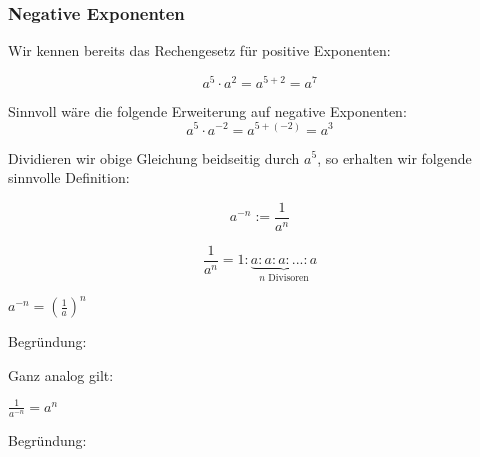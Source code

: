 \subsubsection{Negative Exponenten}
Wir kennen bereits das Rechengesetz für positive Exponenten:

$$a^5\cdot{}a^2 = a^{5+2} = a^7$$

Sinnvoll wäre die folgende Erweiterung auf negative
Exponenten:\\
$$a^5\cdot{}a^{-2} = a^{5+(-2)} = a^3$$

Dividieren wir obige Gleichung beidseitig durch $a^5$, so erhalten wir
folgende sinnvolle Definition:


\begin{definition}{}{}
$$a^{-n} := \frac{1}{a^n}$$
\end{definition}

\begin{bemerkung}{}{}
$$\frac{1}{a^n}= 1 : \underbrace{a : a : a : ... : a}_{n \text{\ Divisoren}}$$
\end{bemerkung}

\begin{gesetz}{}{}
$a^{-n} = \left(\frac1a\right)^n$
\end{gesetz}
Begründung:



Ganz analog gilt:

\begin{gesetz}{}{}
$\frac{1}{a^{-n}} =a^n$
\end{gesetz}
Begründung:



